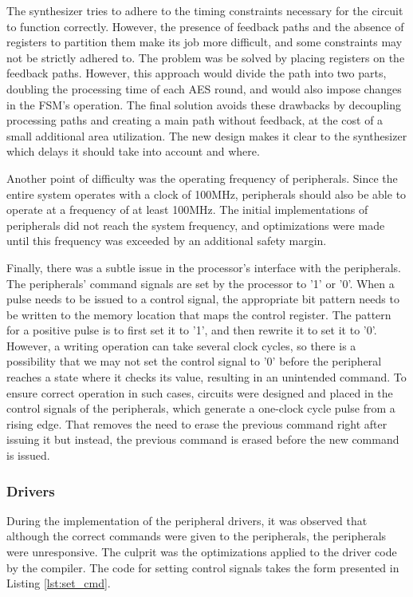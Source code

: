 
The synthesizer tries to adhere to the timing constraints necessary for the circuit to function correctly. However, the presence of feedback paths and the absence of registers to partition them make its job more difficult, and some constraints may not be strictly adhered to. The problem was be solved by placing registers on the feedback paths. However, this approach would divide the path into two parts, doubling the processing time of each AES round, and would also impose changes in the FSM's operation. The final solution avoids these drawbacks by decoupling processing paths and creating a main path without feedback, at the cost of a small additional area utilization. The new design makes it clear to the synthesizer which delays it should take into account and where.

Another point of difficulty was the operating frequency of peripherals. Since the entire system operates with a clock of 100MHz, peripherals should also be able to operate at a frequency of at least 100MHz. The initial implementations of peripherals did not reach the system frequency, and optimizations were made until this frequency was exceeded by an additional safety margin.

Finally, there was a subtle issue in the processor's interface with the peripherals. The peripherals' command signals are set by the processor to '1' or '0'. When a pulse needs to be issued to a control signal, the appropriate bit pattern needs to be written to the memory location that maps the control register. The pattern for a positive pulse is to first set it to '1', and then rewrite it to set it to '0'. However, a writing operation can take several clock cycles, so there is a possibility that we may not set the control signal to '0' before the peripheral reaches a state where it checks its value, resulting in an unintended command. To ensure correct operation in such cases, circuits were designed and placed in the control signals of the peripherals, which generate a one-clock cycle pulse from a rising edge. That removes the need to erase the previous command right after issuing it but instead, the previous command is erased before the new command is issued.

\subsubsection*{Drivers}
During the implementation of the peripheral drivers, it was observed that although the correct commands were given to the peripherals, the peripherals were unresponsive. The culprit was the optimizations applied to the driver code by the compiler. The code for setting control signals takes the form presented in Listing \ref{lst:set_cmd}.

